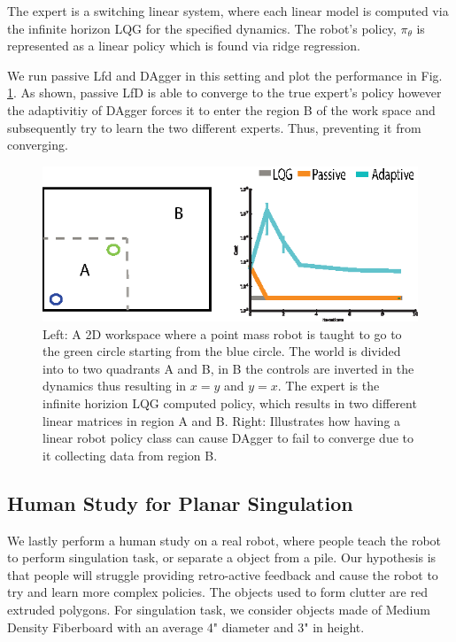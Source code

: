\documentclass[10pt, conference]{ieeeconf}      %
\begin{document}
The expert is a switching linear system, where each linear model is computed via the infinite horizon LQG for the specified dynamics. The robot's policy, $\pi_{\theta}$ is represented as a linear policy which is found via ridge regression.

We run passive Lfd and DAgger in this setting and plot the performance in Fig. \ref{fig:p_mass}. As shown, passive LfD is able to converge to the true expert's policy however the adaptivitiy of DAgger forces it to enter the region B of the work space and subsequently try to learn the two different experts. Thus, preventing it from converging. 

\begin{figure}
\centering
\includegraphics{f_figs/p_mass.eps}
\caption{
    \footnotesize
Left: A 2D workspace where a point mass robot is taught to go to the green circle starting from the blue circle. The world is divided into to two quadrants A and B, in B the controls are inverted in the dynamics thus resulting in $x=y$ and $y=x$. The expert is the infinite horizion LQG computed policy, which results in two different linear matrices in region A and B. Right: Illustrates how having a linear robot policy class can cause DAgger to fail  to converge due to it collecting data from region B.  }
\vspace*{-1pt}
\label{fig:p_mass}
\end{figure}

\subsection{Human Study for Planar Singulation}
We lastly perform a human study on a real robot, where people teach the robot to perform singulation task, or separate a object from a pile. Our hypothesis is that people will struggle providing retro-active feedback and cause the robot to try and learn more complex policies.  The objects used to form clutter are red extruded polygons.  For singulation task, we consider objects made of Medium Density Fiberboard with an average 4" diameter and 3" in height. 
\end{document}
